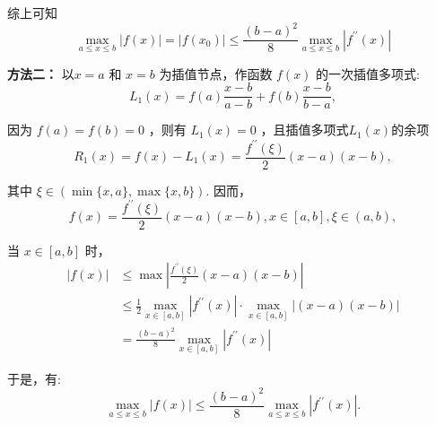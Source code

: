 \begin{tcolorbox}
综上可知 $$ \max _{a \leq x \leq b}|f(x)|=|f(x_0)| \leq \frac{(b-a)^{2}}{8} \max _{a \leq x \leq b}\left|f^{\prime \prime}(x)\right| $$

 \hspace{2em}\textbf{方法二：}
以$ x=a $ 和 $ x=b $ 为插值节点，作函数 $ f(x) $ 的一次插值多项式:
$$
L_{1}(x)=f(a) \frac{x-b}{a-b}+f(b) \frac{x-b}{b-a},
$$

因为 $ f(a)=f(b)=0 $ ，则有 $ L_{1}(x)=0 $ ，且插值多项式$L_{1}(x)$的余项
$$
R_1(x)=f(x)-L_{1}(x)=\frac{f^{\prime \prime}(\xi)}{2}(x-a)(x-b),
$$

其中 $ \xi \in(\min \{x, a\}, \max \{x, b\}) $. 因而，
$$
f(x)=\frac{f^{\prime \prime}(\xi)}{2}(x-a)(x-b), x \in[a, b], \xi \in(a, b),
$$

当 $ x \in[a, b] $ 时，
$$
\begin{aligned}
|f(x)| &\leq \max \left|\frac{f^{\prime \prime}(\xi)}{2}(x-a)(x-b)\right| \\
&\leq \frac{1}{2} \max _{x \in[a, b]}\left|f^{\prime \prime}(x)\right| \cdot \max _{x \in[a, b]}|(x-a)(x-b)| \\
&=\frac{(b-a)^{2}}{8} \max _{x \in[a, b]}\left|f^{\prime \prime}(x)\right|
\end{aligned}
$$

于是，有:
$$
\max _{a \leq x \leq b}|f(x)| \leq \frac{(b-a)^{2}}{8} \max _{a \leq x \leq b}\left|f^{\prime \prime}(x)\right| .
$$

\end{tcolorbox}


